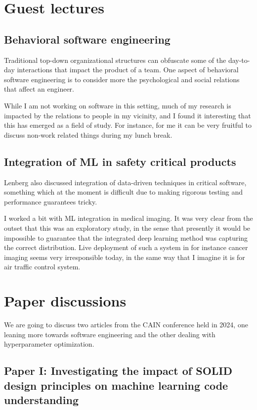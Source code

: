 \documentclass[11pt]{diazessay}
\begin{document}
\section*{Guest lectures}

\subsection*{Behavioral software engineering}

Traditional top-down organizational structures can obfuscate some of the day-to-day interactions that impact the product of a team. One aspect of behavioral software engineering is to consider more the psychological and social relations that affect an engineer\cite{lenberg2015behavioral}.

While I am not working on software in this setting, much of my research is impacted by the relations to people in my vicinity, and I found it interesting that this has emerged as a field of study.
For instance, for me it can be very fruitful to discuss non-work related things during my lunch break.


\subsection*{Integration of ML in safety critical products}

Lenberg also discussed integration of data-driven techniques in critical software, something which at the moment is difficult due to making rigorous testing and performance guarantees tricky.

I worked a bit with ML integration in medical imaging. It was very clear from the outset that this was an exploratory study, in the sense that presently it would be impossible to guarantee that the integrated deep learning method was capturing the correct distribution. Live deployment of such a system in for instance cancer imaging seems very irresponsible today, in the same way that I imagine it is for air traffic control system.

\section*{Paper discussions}

We are going to discuss two articles from the CAIN conference held in 2024, one leaning more towards software engineering and the other dealing with hyperparameter optimization.

\subsection*{Paper I: Investigating the impact of SOLID design principles on machine learning code understanding\cite{cabral2024investigating}}
\end{document}
